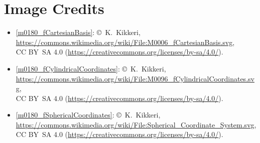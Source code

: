 

\label{m0181_Ch_End_Matter_Preliminary_Concepts_v2} %

\onecolumn
\section*{Image Credits}

\begin{itemize}

\item[Fig.] \label{m0180_fCartesianBasis_Credit}
  \ref{m0180_fCartesianBasis}:
  \copyright~K.\ Kikkeri, 
  \url{https://commons.wikimedia.org/wiki/File:M0006_fCartesianBasis.svg},\\ 
  CC BY~SA 4.0 (\url{https://creativecommons.org/licenses/by-sa/4.0/}).

\item[Fig.] \label{m0180_fCylindricalCoordinates_Credit}
  \ref{m0180_fCylindricalCoordinates}:
  \copyright~K.\ Kikkeri, 
  \url{https://commons.wikimedia.org/wiki/File:M0096_fCylindricalCoordinates.svg},\\ 
  CC BY~SA 4.0 (\url{https://creativecommons.org/licenses/by-sa/4.0/}).

\item[Fig.] \label{m0180_fSphericalCoordinates_Credit}
  \ref{m0180_fSphericalCoordinates}:
  \copyright~K.\ Kikkeri, 
  \url{https://commons.wikimedia.org/wiki/File:Spherical_Coordinate_System.svg},\\ 
  CC BY~SA 4.0 (\url{https://creativecommons.org/licenses/by-sa/4.0/}).

\end{itemize}

\twocolumn
